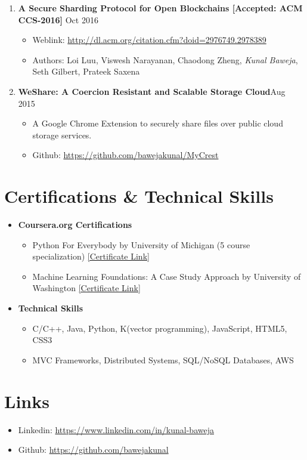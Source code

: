\documentclass{article}
\newcommand{\bi}{\vspace{-1mm}\begin{itemize}[align=left,leftmargin=*, labelindent=0pt,labelsep=2pt, label={-}, nosep]}
\newcommand{\ei}{\end{itemize}}
\begin{document}
\begin{enumerate}
    \item \textbf{A Secure Sharding Protocol for Open Blockchains [Accepted: ACM CCS-2016]} {\hfill Oct 2016}
    \bi
        \item Weblink: \href{http://dl.acm.org/citation.cfm?doid=2976749.2978389}{http://dl.acm.org/citation.cfm?doid=2976749.2978389}
        
        \item Authors: Loi Luu, Viswesh Narayanan, Chaodong Zheng, \textit{Kunal Baweja}, Seth Gilbert, Prateek Saxena
    \ei

    \item \textbf{WeShare: A Coercion Resistant and Scalable Storage Cloud}{\hfill Aug 2015}
    \bi
        \item A Google Chrome Extension to securely share files over public cloud storage services.
        \item Github: \href{https://github.com/bawejakunal/MyCrest}{https://github.com/bawejakunal/MyCrest}
    \ei

\end{enumerate}


\section*{Certifications \& Technical Skills}
\begin{itemize}
    \item \textbf{Coursera.org Certifications}
    \bi
        \item Python For Everybody by University of Michigan (5 course specialization) \href{https://www.coursera.org/account/accomplishments/specialization/2B5PCJGZ9WEE}{[Certificate Link]}

        \item Machine Learning Foundations: A Case Study Approach by University of Washington \href{https://www.coursera.org/account/accomplishments/certificate/NDVXWMCYKX9N}{[Certificate Link]}
    \ei

    \item \textbf{Technical Skills}
    \bi
        \item C/C++, Java, Python, K(vector programming), JavaScript, HTML5, CSS3
        \item MVC Frameworks, Distributed Systems, SQL/NoSQL Databases, AWS
    \ei
\end{itemize}

\section*{Links}
\begin{itemize}[nosep]
    \item Linkedin: \href{https://www.linkedin.com/in/kunal-baweja}{https://www.linkedin.com/in/kunal-baweja}
    \item Github: \href{https://github.com/bawejakunal}{https://github.com/bawejakunal}
\end{itemize}
\end{document}
